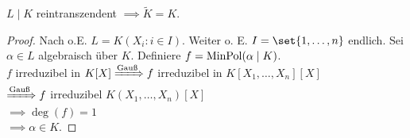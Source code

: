 \begin{proposition}
	$L\mid K$ reintranszendent $\implies \tilde{K} = K$.
\end{proposition}
\begin{proof}
	Nach  o.E. $L = K(X_i : i \in I)$. Weiter o. E. $I = \set{1, \dots,n}$ endlich. Sei $\alpha \in L$ algebraisch über $K$. Definiere $f = \operatorname{MinPol}(\alpha \mid K)$.\\
	$f$ irreduzibel in $K[X] \xRightarrow{\text{Gauß}} f$ irreduzibel in $K[X_1, \dots, X_n][X]$\\
	$\xRightarrow{\text{Gauß}} f$ irreduzibel $K(X_1, \dots, X_n)[X]$\\
	$\implies \deg(f) = 1$\\
	$\implies \alpha \in K$.
\end{proof}